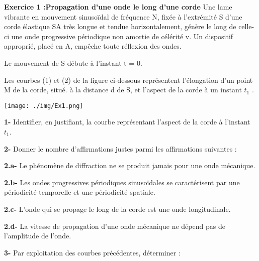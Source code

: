 \documentclass[12pt, french]{article}
\begin{document}
\begin{center}
\end{center}

\vspace{-0.2cm}



\begin{Box2}{\textbf{Exercice 1 :Propagation d'une onde le long d'une corde }}
Une lame vibrante en mouvement sinusoïdal de fréquence N, fixée à l'extrémité S d'une corde élastique SA très longue et tendue horizontalement, génère le long de celle-ci une onde progressive périodique non amortie de célérité v.  Un dispositif approprié, placé en A, empêche toute réflexion des ondes.

Le mouvement de S débute à l'instant t = 0.

Les courbes (1) et (2) de la figure ci-dessous représentent l’élongation d'un point M de la corde, situé.
à la distance d de S, et l'aspect de la corde à un instant $t_1$ .

   \begin{center}
	   \vspace{-0.3cm}
	\texttt{[image: ./img/Ex1.png]}
  \end{center}

  \textbf{1- }Identifier, en justifiant, la courbe représentant l'aspect de la corde à l'instant $t_1$.

  \textbf{2- }Donner le nombre d'affirmations justes parmi les affirmations suivantes :
  
  \textbf{2.a- }Le phénomène de diffraction ne se produit jamais pour une onde mécanique.
  
  \textbf{2.b- }Les ondes progressives périodiques sinusoïdales se caractérisent par une périodicité temporelle et une périodicité spatiale.
  
  \textbf{2.c- }L'onde qui se propage le long de la corde est une onde longitudinale.

  \textbf{2.d- }La vitesse de propagation d'une onde mécanique ne dépend pas de l'amplitude de l'onde.

\textbf{3- }Par exploitation des courbes précédentes, déterminer :


\end{Box2}
\end{document}
